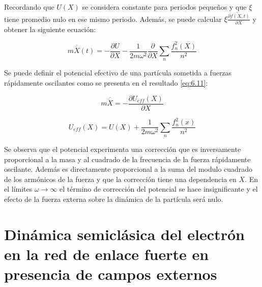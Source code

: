 Recordando que $U(X)$ se considera constante para periodos pequeños y que $\xi$ tiene promedio nulo en ese mismo periodo. Además, se puede calcular $\overline{\xi\frac{\partial f(X,t)}{\partial X}}$ y obtener la siguiente ecuación:

\begin{equation}\label{eq:6.9}
     m\overline{\ddot{X}}(t) =-\frac{\partial U}{\partial X}-\frac{1}{2m\omega^2}\frac{\partial}{\partial X}\sum_n \frac{f_n^2(X)}{n^2}
\end{equation}

Se puede definir el potencial efectivo de una partícula sometida a fuerzas rápidamente oscilantes como se presenta en el resultado \ref{eq:6.11}:

\begin{equation}\label{eq:6.10}
    m\overline{\ddot{X}}=-\frac{\partial U_{eff}(X)}{\partial X}
\end{equation}

\begin{equation}\label{eq:6.11}
U_{eff}(X)=U(X)+\frac{1}{2m\omega^2}\sum_n \frac{f_n^2(x)}{n^2}   
\end{equation}

Se observa que el potencial experimenta una corrección que es inversamente proporcional a la masa y al cuadrado de la frecuencia de la fuerza rápidamente oscilante. Además es directamente proporcional a la suma del modulo cuadrado de los armónicos de la fuerza y que la corrección tiene una dependencia en $X$. En el límites $\omega \rightarrow \infty$ el término de corrección del potencial se hace insignificante y el efecto de la fuerza externa sobre la dinámica de la partícula será nulo.

\section{Dinámica semiclásica del electrón en la red de enlace fuerte en presencia de campos externos}\label{cap:7}


